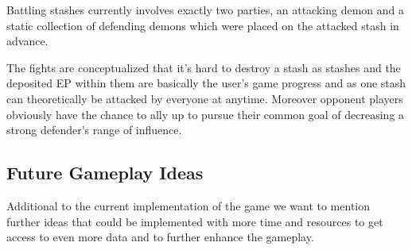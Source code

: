 

Battling stashes currently involves exactly two parties, an attacking demon and a static collection of defending demons which were placed on the attacked stash in advance.





The fights are conceptualized that it's hard to destroy a stash as stashes and the deposited EP within them are basically the user's game progress and as one stash can theoretically be attacked by everyone at anytime.
Moreover opponent players obviously have the chance to ally up to pursue their common goal of decreasing a strong defender's range of influence.



\subsection{Future Gameplay Ideas}
\label{subsec:futuregameplayideas}

Additional to the current implementation of the game we want to mention further ideas that could be implemented with more time and resources to get access to even more data and to further enhance the gameplay.

